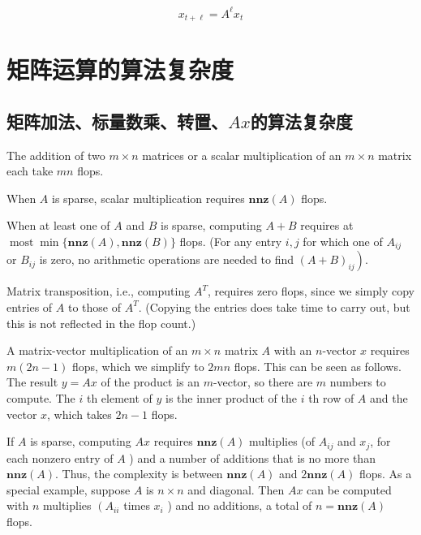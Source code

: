 \begin{example}
    \begin{equation} x_{t+\ell}=A^{\ell} x_{t} \end{equation}
\end{example}

\section{矩阵运算的算法复杂度}

\label{complexity:matrix-operations}

\subsection{矩阵加法、标量数乘、转置、$Ax$的算法复杂度}

The addition of two $ m \times n $ matrices or a scalar multiplication of an $ m \times n $ matrix each take $ m n $ flops.

When $ A $ is sparse, scalar multiplication requires $ \mathbf{n n z}(A) $ flops. 

When at least one of $ A $ and $ B $ is sparse, computing $ A+B $ requires at $ \operatorname{most} \min \{\mathbf{n n z}(A), \mathbf{n n z}(B)\} $ flops. (For any entry $ i, j $ for which one of $ A_{i j} $ or $ B_{i j} $ is zero, no arithmetic operations are needed to find $ \left.(A+B)_{i j} \right) $.

Matrix transposition, i.e., computing $ A^{T} $, requires zero flops, since we simply copy entries of $ A $ to those of $ A^{T} $. (Copying the entries does take time to carry out, but this is not reflected in the flop count.)

A matrix-vector multiplication of an $ m \times n $ matrix $ A $ with an $ n $-vector $ x $ requires $ m(2 n-1) $ flops, which we simplify to $ 2 m n $ flops. This can be seen as follows. The result $ y=A x $ of the product is an $ m $-vector, so there are $ m $ numbers to compute. The $ i $ th element of $ y $ is the inner product of the $ i $ th row of $ A $ and the vector $ x $, which takes $ 2 n-1 $ flops.

If $ A $ is sparse, computing $ A x $ requires $ \mathbf{n n z}(A) $ multiplies (of $ A_{i j} $ and $ x_{j} $, for each nonzero entry of $ A $ ) and a number of additions that is no more than $ \mathbf{n n z}(A) $. Thus, the complexity is between $ \mathbf{n n z}(A) $ and $ 2 \mathbf{n n z}(A) $ flops. As a special example, suppose $ A $ is $ n \times n $ and diagonal. Then $ A x $ can be computed with $ n $ multiplies $ \left(A_{i i}\right. $ times $ x_{i} $ ) and no additions, a total of $ n=\mathbf{n n z}(A) $ flops.

